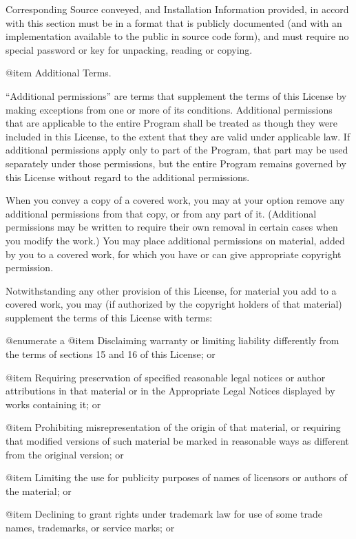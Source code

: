 Corresponding Source conveyed, and Installation Information provided,
in accord with this section must be in a format that is publicly
documented (and with an implementation available to the public in
source code form), and must require no special password or key for
unpacking, reading or copying.

@item Additional Terms.

``Additional permissions'' are terms that supplement the terms of this
License by making exceptions from one or more of its conditions.
Additional permissions that are applicable to the entire Program shall
be treated as though they were included in this License, to the extent
that they are valid under applicable law.  If additional permissions
apply only to part of the Program, that part may be used separately
under those permissions, but the entire Program remains governed by
this License without regard to the additional permissions.

When you convey a copy of a covered work, you may at your option
remove any additional permissions from that copy, or from any part of
it.  (Additional permissions may be written to require their own
removal in certain cases when you modify the work.)  You may place
additional permissions on material, added by you to a covered work,
for which you have or can give appropriate copyright permission.

Notwithstanding any other provision of this License, for material you
add to a covered work, you may (if authorized by the copyright holders
of that material) supplement the terms of this License with terms:

@enumerate a
@item
Disclaiming warranty or limiting liability differently from the terms
of sections 15 and 16 of this License; or

@item
Requiring preservation of specified reasonable legal notices or author
attributions in that material or in the Appropriate Legal Notices
displayed by works containing it; or

@item
Prohibiting misrepresentation of the origin of that material, or
requiring that modified versions of such material be marked in
reasonable ways as different from the original version; or

@item
Limiting the use for publicity purposes of names of licensors or
authors of the material; or

@item
Declining to grant rights under trademark law for use of some trade
names, trademarks, or service marks; or

